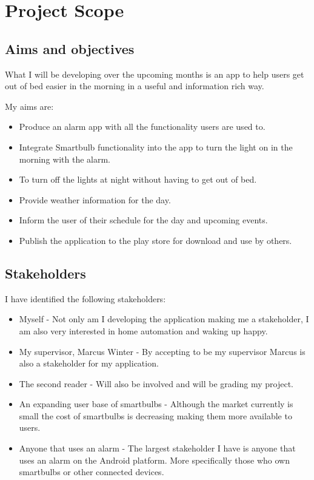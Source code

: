 \section{Project Scope}\label{project-scope}

\subsection{Aims and objectives}\label{aims-and-objectives}

What I will be developing over the upcoming months is an app to help
users get out of bed easier in the morning in a useful and information
rich way.

My aims are:

\begin{itemize}
\tightlist
\item
  Produce an alarm app with all the functionality users are used to.
\item
  Integrate Smartbulb functionality into the app to turn the light on in
  the morning with the alarm.
\item
  To turn off the lights at night without having to get out of bed.
\item
  Provide weather information for the day.
\item
  Inform the user of their schedule for the day and upcoming events.
\item
  Publish the application to the play store for download and use by
  others.
\end{itemize}

\subsection{Stakeholders}\label{stakeholders}

I have identified the following stakeholders:

\begin{itemize}
\item
  Myself - Not only am I developing the application making me a
  stakeholder, I am also very interested in home automation and waking
  up happy.
\item
  My supervisor, Marcus Winter - By accepting to be my supervisor Marcus
  is also a stakeholder for my application.
\item
  The second reader - Will also be involved and will be grading my
  project.
\item
  An expanding user base of smartbulbs - Although the market currently
  is small the cost of smartbulbs is decreasing making them more
  available to users.
\item
  Anyone that uses an alarm - The largest stakeholder I have is anyone
  that uses an alarm on the Android platform. More specifically those
  who own smartbulbs or other connected devices.
\end{itemize}

